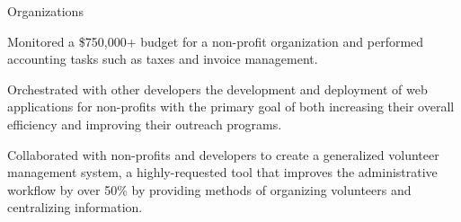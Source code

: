 \documentclass{resume} %
\begin{document}
\begin{workSection}{Organizations}
    \customItem[
        title=Delta Chi Fraternity,
        keyHighlight=Treasurer{,} Technology Chair,
        duration=August 2021\textendash{Present},
        location=Atlanta{,} GA
    ]
    \begin{bullets}
        \item Monitored a \$750,000+ budget for a non-profit organization and performed accounting tasks such as taxes and invoice management.
    \end{bullets}

    \customItem[
        title=Bits of Good,
        keyHighlight=Developer,
        duration=January 2023\textendash{May 2024},
        location=Atlanta{,} GA
    ]
     \begin{bullets}
       \item Orchestrated with other developers the development and deployment of web applications for non-profits with the primary goal of both increasing their overall efficiency and improving their outreach programs.
       \item Collaborated with non-profits and developers to create a generalized volunteer management system, a highly-requested tool that improves the administrative workflow by over 50\% by providing methods of organizing volunteers and centralizing information.

     \end{bullets}
     
\end{workSection}
\end{document}
